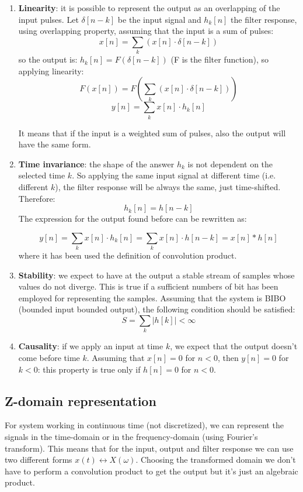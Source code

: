 \begin{enumerate}

  \item \textbf{Linearity}: it is possible to represent the output as an overlapping of the input pulses. Let $\delta[n-k]$ be the input signal and $h_k[n]$ the filter response,  using overlapping property, assuming that the input is a sum of pulses:
  $$x[n]=\sum_k  (x[n] \cdot \delta[n-k])$$
  so the output is:
  $h_k[n]= F(\delta[n-k])$  (F is the filter function), so applying linearity:
  $$F(x[n])= F(\sum_k  (x[n] \cdot \delta[n-k]))$$
  $$y[n]=\sum_k x[n] \cdot h_k[n]$$

  It means that if the input is a weighted sum of pulses, also the output will have the same form.

  \item \textbf{Time invariance}: the shape of the answer $h_k$ is not dependent on the selected time $k$. So applying the same input signal at different time (i.e. different $k$), the filter response will be always the same, just time-shifted. Therefore:
  $$h_k[n] = h[n-k]$$
  The expression for the output found before can be rewritten as:

  $$y[n]=\sum_k x[n] \cdot h_k[n]=\sum_k x[n] \cdot h[n-k] = x[n] * h[n]  $$
  where it has been used the definition of convolution product.

  \item \textbf{Stability}: we expect to have at the output a stable stream of samples whose values do not diverge. This is true if a sufficient numbers of bit has been employed for representing the samples. Assuming that the system is BIBO (bounded input bounded output), the following condition should be satisfied:
  $$S=\sum_k |h[k]| < \infty $$

  \item \textbf{Causality}: if we apply an input at time $k$, we expect that the output doesn't come before time $k$. Assuming that
  $x[n]=0$ for $n<0$, then $y[n]=0$ for $k<0$: this property is true only if $h[n]=0$ for $n<0$.

\end{enumerate}

\subsection{Z-domain representation}
For system working in continuous time (not discretized), we can represent the signals in the time-domain or in the frequency-domain (using Fourier's transform). This means that for the input, output and filter response we can use two different forms $x(t) \leftrightarrow X(\omega)$. Choosing the transformed domain we don't have to perform a convolution product to get the output but it's just an algebraic product. \\

